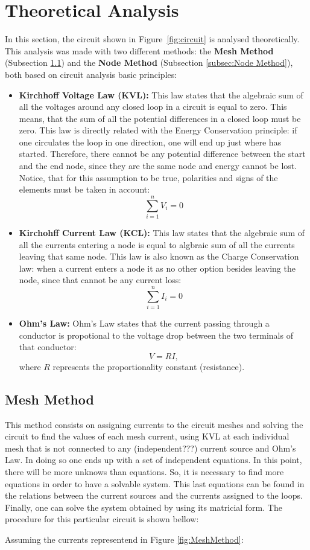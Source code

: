 \section{Theoretical Analysis}
\label{sec:analysis}

In this section, the circuit shown in Figure~\ref{fig:circuit} is analysed
theoretically. This analysis was made with two different methods: the \textbf{Mesh Method} (Subsection \ref{subsec:Mesh Method}) and the \textbf{Node Method} (Subsection \ref{subsec:Node Method}), both based on circuit analysis basic principles:
\begin{itemize}
\item \textbf{Kirchhoff Voltage Law (KVL):} This law states that the algebraic sum of all the voltages around any closed loop in a circuit is equal to zero. This means, that the sum of all the potential differences in a closed loop must be zero. This law is directly related with the Energy Conservation principle: if one circulates the loop in one direction, one will end up just where has started. Therefore, there cannot be any potential difference between the start and the end node, since they are the same node and energy cannot be lost. Notice, that for this assumption to be true, polarities and signs of the elements must be taken in account:$$\sum_{i=1}^{n}V_{i}=0$$
\item \textbf{Kirchohff Current Law (KCL):} This law states that the algebraic sum of all the currents entering a node is equal to algbraic sum of all the currents leaving that same node. This law is also known as the Charge Conservation law: when a current enters a node it as no other option besides leaving the node, since that cannot be any current loss: $$\sum_{i=1}^{n}I_{i}=0$$
  \item \textbf{Ohm's Law:} Ohm's Law states that the current passing through a conductor is propotional to the voltage drop between the two terminals of that conductor: $$V = RI,$$ where $R$ represents the proportionality constant (resistance). 
  
\end{itemize}


\subsection{Mesh Method}
\label{subsec:Mesh Method}\par
This method consists on assigning currents to the circuit meshes and solving the circuit to find the values of each mesh current, using KVL at each individual mesh that is not connected to any (independent???) current source and Ohm's Law. In doing so one ends up with a set of independent equations. In this point, there will be more unknows than equations. So, it is necessary to find more equations in order to have a solvable system. This last equations can be found in the relations between the current sources and the currents assigned to the loops. Finally, one can solve the system obtained by using its matricial form. The procedure for this particular circuit is shown bellow:\par
Assuming the currents representend in Figure \ref{fig:MeshMethod}:

